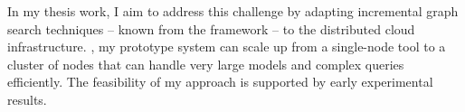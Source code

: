 In my thesis work, I aim to address this challenge by adapting incremental graph search techniques -- known from the \eiq{} framework -- to the distributed cloud infrastructure. \iqd, my prototype system can scale up from a single-node tool to a cluster of nodes that can handle very large models and complex queries efficiently. The feasibility of my approach is supported by early experimental results.

\vfill

